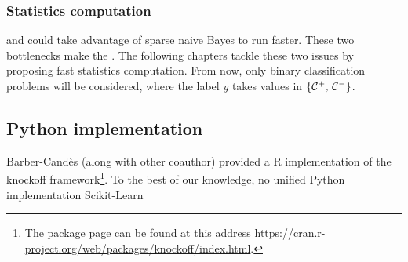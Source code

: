 \subsubsection{Statistics computation}\label{subsubsec:bot_stats}

and could take advantage of sparse naive Bayes to run faster.
\bigbreak
These two bottlenecks make the .
The following chapters tackle these two issues by proposing fast statistics computation.
From now, only binary classification problems will be considered, where the label $y$ takes values
in $\left\{ \mathcal{C}^+,\, \mathcal{C}^- \right\}$.

\subsection{Python implementation}\label{subsec:python_implementation}

Barber-Candès (along with other coauthor) provided a R implementation
of the knockoff framework\footnote{
        The package page can be found at this address \url{https://cran.r-project.org/web/packages/knockoff/index.html}.
}.
To the best of our knowledge, no unified Python implementation
Scikit-Learn~\cite{sklearn}

